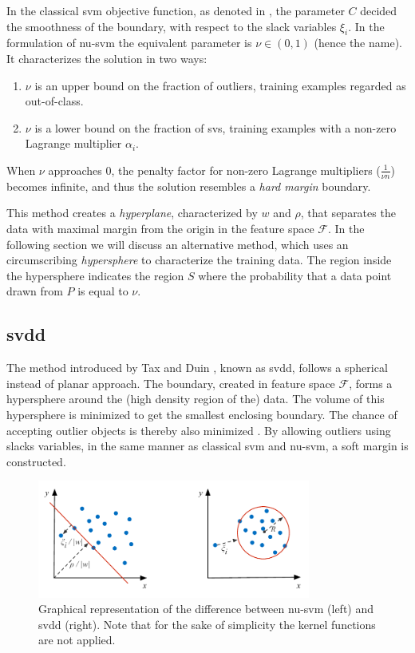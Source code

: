 In the classical \gls{svm} objective function, as denoted in , the parameter $C$ decided the smoothness of the boundary, with respect to the slack variables $\xi_i$.
In the formulation of \gls{nu-svm} the equivalent parameter is $\nu \in (0,1)$ (hence the name).
It characterizes the solution in two ways:
\begin{enumerate}
  \item $\nu$ is an upper bound on the fraction of outliers, \ie training examples regarded as out-of-class.
  \item $\nu$ is a lower bound on the fraction of \glspl{sv}, \ie training examples with a non-zero Lagrange multiplier $\alpha_i$.
\end{enumerate}
When $\nu$ approaches $0$, the penalty factor for non-zero Lagrange multipliers ($\frac{1}{\nu n}$) becomes infinite, and thus the solution resembles a \emph{hard margin} boundary.

This method creates a \emph{hyperplane}, characterized by $w$ and $\rho$, that separates the data with maximal margin from the origin in the feature space $\mathcal{F}$.
In the following section we will discuss an alternative method, which uses an circumscribing \emph{hypersphere} to characterize the training data.
The region inside the hypersphere indicates the region $S$ where the probability that a data point drawn from $P$ is equal to $\nu$.



\subsection{\texorpdfstring{\acrlong{svdd}}{SVDD}}\label{subsec:oc-svm-svdd}
The method introduced by Tax and Duin \cite{tax1999support}, known as \acrlong{svdd}, follows a spherical instead of planar approach.
The boundary, created in feature space $\mathcal{F}$, forms a hypersphere around the (high density region of the) data.
The volume of this hypersphere is minimized to get the smallest enclosing boundary.
The chance of accepting outlier objects is thereby also minimized \cite{tax2003online}.
By allowing outliers using slacks variables, in the same manner as classical \gls{svm} and \gls{nu-svm}, a soft margin is constructed.

\begin{figure}
  \centering
    \includegraphics[width=0.8\textwidth,keepaspectratio]{./Figures/chapter3/nu-vs-svdd.pdf}
  \caption[Relation between $\nu$-SVM and SVDD]{Graphical representation of the difference between \gls{nu-svm} (left) and \gls{svdd} (right). Note that for the sake of simplicity the kernel functions are not applied.}
  \label{fig:nu-vs-svdd}
\end{figure}

